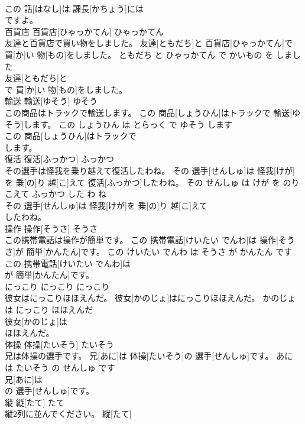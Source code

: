 \documentclass[8pt]{extreport}
\begin{document}
\begin{CJK}{UTF8}{min}
\\	この 話[はなし]は 課長[かちょう]には
\\	ですよ。			
\\	百貨店	百貨店[ひゃっかてん]	ひゃっかてん	
\\	友達と百貨店で買い物をしました。	友達[ともだち]と 百貨店[ひゃっかてん]で 買[か]い 物[もの]をしました。	ともだち と ひゃっかてん で かいもの を しました	
\\	友達[ともだち]と
\\	で 買[か]い 物[もの]をしました。			
\\	輸送	輸送[ゆそう]	ゆそう	
\\	この商品はトラックで輸送します。	この 商品[しょうひん]はトラックで 輸送[ゆそう]します。	この しょうひん は とらっく で ゆそう します	
\\	この 商品[しょうひん]はトラックで
\\	します。			
\\	復活	復活[ふっかつ]	ふっかつ	
\\	その選手は怪我を乗り越えて復活したわね。	その 選手[せんしゅ]は 怪我[けが]を 乗[の]り 越[こ]えて 復活[ふっかつ]したわね。	その せんしゅ は けが を のりこえて ふっかつ した わ ね	
\\	その 選手[せんしゅ]は 怪我[けが]を 乗[の]り 越[こ]えて
\\	したわね。			
\\	操作	操作[そうさ]	そうさ	
\\	この携帯電話は操作が簡単です。	この 携帯電話[けいたい でんわ]は 操作[そうさ]が 簡単[かんたん]です。	この けいたい でんわ は そうさ が かんたん です	
\\	この 携帯電話[けいたい でんわ]は
\\	が 簡単[かんたん]です。			
\\	にっこり	にっこり	にっこり	
\\	彼女はにっこりほほえんだ。	彼女[かのじょ]はにっこりほほえんだ。	かのじょ は にっこり ほほえんだ	
\\	彼女[かのじょ]は
\\	ほほえんだ。			
\\	体操	体操[たいそう]	たいそう	
\\	兄は体操の選手です。	兄[あに]は 体操[たいそう]の 選手[せんしゅ]です。	あに は たいそう の せんしゅ です	
\\	兄[あに]は
\\	の 選手[せんしゅ]です。			
\\	縦	縦[たて]	たて	
\\	縦2列に並んでください。	縦[たて] 

\end{CJK}
\end{document}
